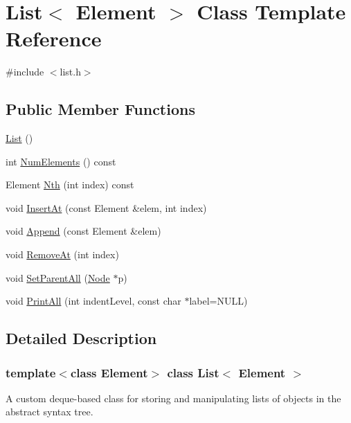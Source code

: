 \hypertarget{class_list}{}\section{List$<$ Element $>$ Class Template Reference}
\label{class_list}


{\ttfamily \#include $<$list.\+h$>$}

\subsection*{Public Member Functions}
\begin{DoxyCompactItemize}
\item 
\hyperlink{class_list_acdfa9a2a43d22f973fe2ecc55318847a}{List} ()
\item 
int \hyperlink{class_list_a7197533d7f956ee56ecb27784b9e647f}{Num\+Elements} () const
\item 
Element \hyperlink{class_list_ae5bbd00a0cfcfec0104347a43123911c}{Nth} (int index) const
\item 
void \hyperlink{class_list_a8d86a82c138b259da6fa0d046aed985b}{Insert\+At} (const Element \&elem, int index)
\item 
void \hyperlink{class_list_a473190098e38206d0125b0737245e613}{Append} (const Element \&elem)
\item 
void \hyperlink{class_list_af17f72d263f90d53ea8501b5b1853470}{Remove\+At} (int index)
\item 
void \hyperlink{class_list_ae461121db8d03106e92af9f87fa68b7d}{Set\+Parent\+All} (\hyperlink{class_node}{Node} $\ast$p)
\item 
void \hyperlink{class_list_a54eba5c4ab139128c47bc535b276be3a}{Print\+All} (int indent\+Level, const char $\ast$label=N\+U\+LL)
\end{DoxyCompactItemize}


\subsection{Detailed Description}
\subsubsection*{template$<$class Element$>$\newline
class List$<$ Element $>$}

A custom deque-\/based class for storing and manipulating lists of objects in the abstract syntax tree. 

